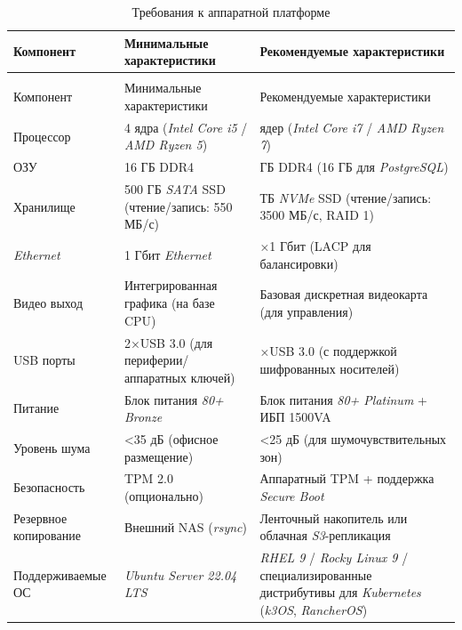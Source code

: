 \begingroup
\singlespacing
\vspace{-\baselineskip}
\begin{longtable}{|>{\raggedright}m{}
                  |>{\raggedright}m{}
                  |>{\raggedright\arraybackslash}m{}|}
    \caption{Требования к аппаратной платформе} \label{table:system-implementation:hardware:requirements} \\ \hline
    Компонент & Минимальные характеристики & Рекомендуемые характеристики \\ \hline
    \endfirsthead
    \multicolumn{3}{@{}l}{\noindent Продолжение таблицы~\thetable} \\ \hline
    Компонент & Минимальные характеристики & Рекомендуемые характеристики \\ \hline
    \endhead
    Процессор & 4 ядра (\textit{Intel Core i5} / \textit{AMD Ryzen 5}) & 8 ядер (\textit{Intel Core i7} / \textit{AMD Ryzen 7}) \\
    \hline
    ОЗУ & 16 ГБ DDR4 & 32 ГБ DDR4 (16 ГБ для \textit{PostgreSQL}) \\
    \hline
    Хранилище & 500 ГБ \textit{SATA} SSD (чтение/запись: 550 МБ/с) & 1 ТБ \textit{NVMe} SSD (чтение/запись: 3500 МБ/с, RAID 1) \\
    \hline
    \textit{Ethernet} & 1 Гбит \textit{Ethernet} & 2×1 Гбит (LACP для балансировки) \\
    \hline
    Видео выход & Интегрированная графика (на базе CPU) & Базовая дискретная видеокарта (для управления) \\
    \hline
    USB порты & 2×USB 3.0 (для периферии/аппаратных ключей) & 4×USB 3.0 (с поддержкой шифрованных носителей) \\
    \hline
    Питание & Блок питания \textit{80+ Bronze} & Блок питания \textit{80+ Platinum} + ИБП 1500VA \\
    \hline
    Уровень шума & <35 дБ (офисное размещение) & <25 дБ (для шумочувствительных зон) \\
    \hline
    Безопасность & TPM 2.0 (опционально) & Аппаратный TPM + поддержка \textit{Secure Boot} \\
    \hline
    Резервное копирование & Внешний NAS (\textit{rsync}) & Ленточный накопитель или облачная \textit{S3}-репликация \\
    \hline
    Поддержи\-ва\-емые ОС & \textit{Ubuntu Server 22.04 LTS} & \textit{RHEL 9} / \textit{Rocky Linux 9} / специализированные дистрибутивы для \textit{Kubernetes} (\textit{k3OS}, \textit{RancherOS}) \\
    \hline
\end{longtable}
\endgroup

